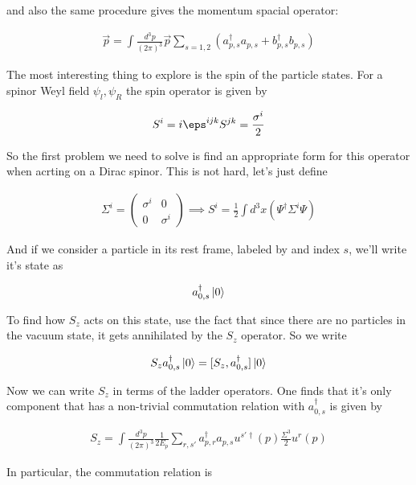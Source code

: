 \documentclass{report}
\begin{document}
and also the same procedure gives the momentum spacial operator: 

\begin{align}
    \vec{p} = \int \frac{d^3p}{(2\pi)^3}\vec{p}\sum_{s=1,2}(a^\dagger_{p, s}a_{p, s}+ b^\dagger_{p,s}b_{p,s})
\end{align}

The most interesting thing to explore is the spin of the particle states. For a spinor Weyl field \(\psi_l, \psi_R\) the spin operator is given by 

\begin{align}
    S^i = i \eps^{ijk}S^{jk} = \frac{\sigma^i}{2}
\end{align}

So the first problem we need to solve is find an appropriate form for this operator when acrting on a Dirac spinor. This is not hard, let's just define 

\begin{align}
    \Sigma^i = \begin{pmatrix}
        \sigma^i & 0 \\
        0 & \sigma^i
    \end{pmatrix}  \implies S^i = \frac{1}{2}\int d^3x (\Psi^\dagger\Sigma^i\Psi)
\end{align}

And if we consider a particle in its rest frame, labeled by and index \(s\), we'll write it's state as 

\begin{align}
    a^\dagger_{0,s}\ket{0}
\end{align}

To find how \(S_z\) acts on this state, use the fact that since there are no particles in the vacuum state, it gets annihilated by the \(S_z\) operator. So we write 

\begin{align}
    S_z a^\dagger_{0, s}\ket{0} = [S_z, a^\dagger_{0,s}]\ket{0}
\end{align}

Now we can write \(S_z\) in terms of the ladder operators. One finds that it's only component that has a non-trivial commutation relation with \(a^\dagger_{0,s}\) is given by 

\begin{align}
    S_z = \int \frac{d^3p}{(2\pi)^3}\frac{1}{2E_p}\sum_{r,s'}a^\dagger_{p,r}a_{p,s}u^{s'\dagger}(p)\frac{\Sigma^3}{2}u^r(p)
\end{align}

In particular, the commutation relation is 
\end{document}
